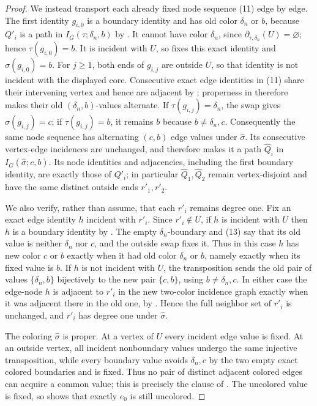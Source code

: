 \begin{proof}
  We instead transport each already fixed node sequence (11) edge by edge.
  The first identity $g_{i,0}$ is a boundary identity and has old color
  $\delta_n$ or $b$, because $Q'_i$ is a path in
  $I_G(\tau;\delta_n,b)$ by .  It cannot
  have color $\delta_n$, since
  $\partial_{\tau,\delta_n}(U)=\varnothing$; hence
  $\tau(g_{i,0})=b$.  It is incident with $U$, so
   fixes this exact identity and
  $\widehat\sigma(g_{i,0})=b$.  For $j\geq1$, both ends of $g_{i,j}$ are
  outside $U$, so that identity is not incident with the displayed core.
  Consecutive exact edge identities in (11) share their intervening vertex
  and hence are adjacent by ; properness in
   therefore makes their old
  $(\delta_n,b)$-values alternate.
  If $\tau(g_{i,j})=\delta_n$, the swap gives
  $\widehat\sigma(g_{i,j})=c$; if $\tau(g_{i,j})=b$, it remains $b$
  because $b\ne\delta_n,c$.  Consequently the same node sequence has
  alternating $(c,b)$ edge values under $\widehat\sigma$.  Its consecutive
  vertex-edge incidences are unchanged, and
   therefore makes it a path
  $\widehat Q_i$ in $I_G(\widehat\sigma;c,b)$.  Its node identities and
  adjacencies, including the first boundary identity, are exactly those of
  $Q'_i$; in particular $\widehat Q_1,\widehat Q_2$ remain vertex-disjoint
  and have the same distinct outside ends $r'_1,r'_2$.

  We also verify, rather than assume, that each $r'_i$ remains degree one.
  Fix an exact edge identity $h$ incident with $r'_i$.  Since
  $r'_i\notin U$, if $h$ is incident with $U$ then $h$ is a boundary
  identity by .  The empty $\delta_n$-boundary and
  (13) say that its old value is neither $\delta_n$ nor $c$, and the outside
  swap fixes it.  Thus in this case $h$ has new color $c$ or $b$ exactly
  when it had old color $\delta_n$ or $b$, namely exactly when its fixed
  value is $b$.  If $h$ is not incident with $U$, the transposition sends
  the old pair of values $\{\delta_n,b\}$ bijectively to the new pair
  $\{c,b\}$, using $b\ne\delta_n,c$.  In either case the edge-node $h$ is
  adjacent to $r'_i$ in the new two-color incidence graph exactly when it
  was adjacent there in the old one, by
  .  Hence the full neighbor set of $r'_i$
  is unchanged, and $r'_i$ has degree one under $\widehat\sigma$.

  The coloring $\widehat\sigma$ is proper.  At a vertex of $U$ every
  incident edge value is fixed.  At an outside vertex, all incident
  nonboundary values undergo the same injective transposition, while every
  boundary value avoids $\delta_n,c$ by the two empty exact colored
  boundaries and is fixed.  Thus no pair of distinct adjacent colored edges
  can acquire a common value; this is precisely the clause of
  .  The uncolored value is fixed, so
   shows that exactly $e_0$ is still uncolored.


\end{proof}
